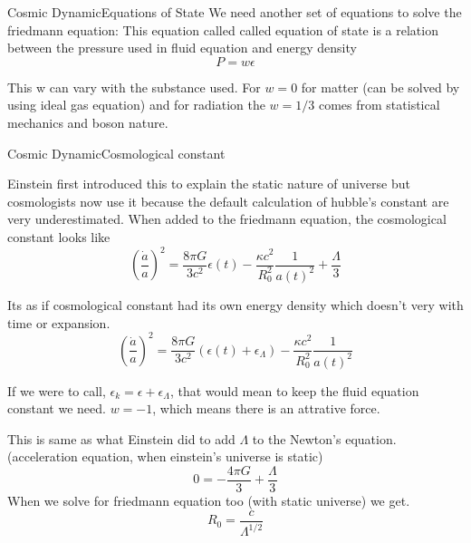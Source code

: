 \begin{frame}{Cosmic Dynamic}{Equations of State}
	We need another set of equations to solve the friedmann equation:
	This equation called called equation of state is a relation between the
	pressure used in fluid equation and energy density
	$$ P = w \epsilon  $$

	This w can vary with the substance used. For $w = 0$ for matter (can be
	solved by using ideal gas equation) and for radiation the $w = 1/3$
	comes from statistical mechanics and boson nature.
\end{frame}


\begin{frame}{Cosmic Dynamic}{Cosmological constant}

	Einstein first introduced this to explain the static nature of universe
	but cosmologists now use it because the default calculation of hubble's
	constant are very underestimated. When added to the friedmann equation,
	the cosmological constant looks like
	$$ \left( \frac{\dot a}{a} \right)^2 = \frac{8\pi G}{3c^2}\epsilon(t) -
	\frac{\kappa c^2}{R_0^2} \frac{1}{a(t)^2} + \frac{\Lambda}{3}$$

	Its as if cosmological constant had its own energy density which doesn't
	very with time or expansion.
	$$ \left( \frac{\dot a}{a} \right)^2 = \frac{8\pi G}{3c^2}(\epsilon(t) +
	\epsilon_\Lambda )-
	\frac{\kappa c^2}{R_0^2} \frac{1}{a(t)^2}$$

	If we were to call, $\epsilon_k = \epsilon + \epsilon_\Lambda$, that
	would mean to keep the fluid equation constant we need. $w = -1$, which
	means there is an attrative force.



\end{frame}

\begin{frame}

	This is same as what Einstein did to add $\Lambda$ to the Newton's
	equation. (acceleration equation, when einstein's universe is static)
	$$ 0 = - \frac{4\pi G}{3} + \frac{\Lambda}{3} $$
	When we solve for friedmann equation too (with static universe) we get.
	$$ R_0 = \frac{c}{\Lambda^{1/2}} $$
\end{frame}
